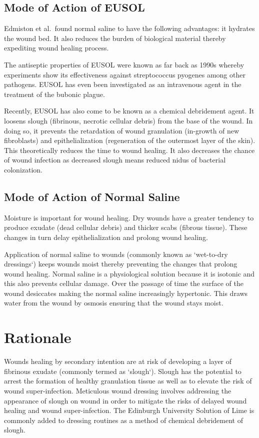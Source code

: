 \documentclass{article}
\begin{document}
\subsection{Mode of Action of EUSOL}
Edmiston et al.\ found normal saline to have the following advantages: it
hydrates the wound bed. It also reduces the burden of biological material
thereby expediting wound healing process.\cite{Edmiston_2016}

The antiseptic properties of EUSOL were known as far back as 1990s whereby
experiments show its effectiveness against streptococcus pyogenes among other
pathogens. EUSOL has even been investigated as an intravenous agent in the
treatment of the bubonic plague.\cite{connor1916eusol}

Recently, EUSOL has also come to be known as a chemical debridement
agent.\cite{Farrow_1991} It loosens slough (fibrinous, necrotic cellular debris)
from the base of the wound. In doing so, it prevents the retardation of wound
granulation (in-growth of new fibroblasts) and epithelialization (regeneration
of the outermost layer of the skin). This theoretically reduces the time to
wound healing. It also decreases the chance of wound infection as decreased
slough means reduced nidus of bacterial colonization.

\subsection{Mode of Action of Normal Saline}
Moisture is important for wound healing. Dry wounds have a greater tendency to
produce exudate (dead cellular debris) and thicker scabs (fibrous tissue). These
changes in turn delay epithelialization and prolong wound
healing.\cite{Winter_1963}

Application of normal saline to wounds (commonly known as `wet-to-dry
dressings`) keeps wounds moist thereby preventing the changes that prolong wound
healing. Normal saline is a physiological solution because it is isotonic and
this also prevents cellular damage. Over the passage of time the surface of the
wound desiccates making the normal saline increasingly hypertonic. This draws
water from the wound by osmosis ensuring that the wound stays
moist.\cite{Lim_2000}

\section{Rationale}
Wounds healing by secondary intention are at risk of developing a layer of
fibrinous exudate (commonly termed as `slough`). Slough has the potential to
arrest the formation of healthy granulation tissue as well as to elevate the
risk of wound super-infection. Meticulous wound dressing involves addressing the appearance of slough on wound in order to mitigate the risks of delayed wound healing and wound super-infection. The Edinburgh University Solution of Lime is commonly added to dressing routines as a method of chemical debridement of slough.
\end{document}
